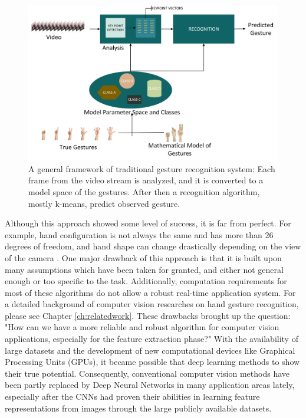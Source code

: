 \begin{figure}[h!]
	\centering
	\includegraphics[width=0.8\linewidth]{figures/cv_gesture_workflow}
	\caption{A general framework of traditional gesture recognition system:  Each frame from the video stream is analyzed, and it is converted to a model space of the gestures.  After then  a recognition algorithm,  mostly k-means, predict  observed gesture.}
	\label{fig:cv_gesture_workflow}
\end{figure}

Although this approach showed some level of success, it is far from perfect.   For example, hand configuration is not always the same and has more than  26 degrees of freedom, and hand shape can change drastically depending on the view of the camera \cite{bergh_haarlet-based_2009}. One major drawback of this approach is that it is built upon many assumptions which have been taken for granted,  and either not general enough or too specific to the task.  Additionally,  computation requirements for most of these algorithms do not allow a robust real-time application system.  For a detailed background of computer vision researches on hand gesture recognition, please see Chapter  \ref{ch:relatedwork}.  These drawbacks brought up the question: "How  can we have a more reliable and robust algorithm for computer vision applications,  especially for the feature extraction phase?" With the availability of large datasets and the development of new computational devices like Graphical  Processing  Units  (GPUs),  it became possible that deep learning methods to show their true potential.   Consequently, conventional computer vision methods have been partly replaced by Deep Neural Networks in many application areas lately,  especially after the CNNs had proven their abilities in learning feature representations from images through the large publicly available datasets.\\

